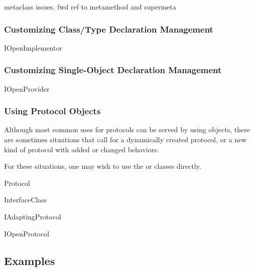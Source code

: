 \begin{verbatim%
}
\begin{verbatim%
}
\begin{verbatim%
}
\begin{verbatim%
}
metaclass issues, fwd ref to metamethod and supermeta


















\subsubsection{Customizing Class/Type Declaration Management}

IOpenImplementor

\subsubsection{Customizing Single-Object Declaration Management}

IOpenProvider

\subsubsection{Using Protocol Objects}
Although most common uses for protocols can be served by using 
objects, there are sometimes situations that call for a dynamically created
protocol, or a new kind of protocol with added or changed behaviors.

For these situations, one may wish to use the  or
 classes directly.

Protocol

InterfaceClass

IAdaptingProtocol

IOpenProtocol


















\subsection{Examples}

\end{verbatim%
}
\end{verbatim%
}
\end{verbatim%
}
\end{verbatim%
}

